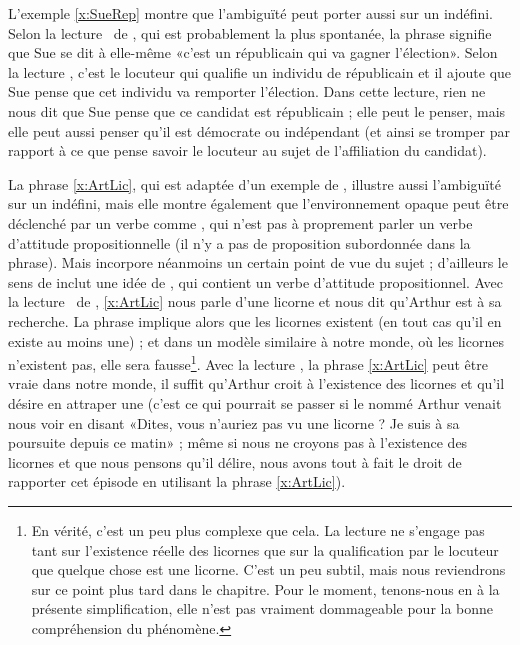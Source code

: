 L'exemple \ref{x:SueRep} montre que l'ambiguïté peut porter aussi sur un {\GN} indéfini.  Selon la lecture \dedicto\ de , qui est probablement la plus spontanée, la phrase signifie que Sue se dit à elle-même «c'est un républicain qui va gagner l'élection».  Selon la lecture \dere, c'est le locuteur qui qualifie un individu de républicain et il ajoute que Sue pense que cet individu va remporter l'élection. Dans cette lecture, rien ne nous dit que Sue pense que ce candidat est républicain ; elle peut le penser, mais elle peut aussi penser qu'il est démocrate ou indépendant (et ainsi se tromper par rapport à ce que pense savoir le locuteur au sujet de l'affiliation du candidat).

\largerpage

La phrase \ref{x:ArtLic}, qui est adaptée d'un exemple de \citet{PTQ}, illustre  aussi l'ambiguïté sur un {\GN} indéfini, mais elle montre également que l'environnement opaque peut être déclenché par un verbe comme , qui n'est pas à proprement parler un verbe d'attitude propositionnelle (il n'y a pas de proposition subordonnée dans la phrase). Mais  incorpore néanmoins un certain point de vue du sujet ; d'ailleurs le sens de  inclut une idée de , qui contient un verbe d'attitude propositionnel.
Avec la lecture \dere\ de , \ref{x:ArtLic} nous parle d'une licorne et nous dit qu'Arthur est à sa recherche. La phrase implique alors que les licornes existent (en tout cas qu'il en existe au moins une) ; et dans un modèle similaire à notre monde, où les licornes n'existent pas, elle sera fausse\footnote{En vérité, c'est un peu plus complexe que cela. La lecture  ne s'engage pas tant sur l'existence réelle des licornes que sur la qualification par le locuteur que quelque chose est une licorne. C'est un peu subtil, mais nous reviendrons sur ce point plus tard dans le chapitre. Pour le moment, tenons-nous en à la présente simplification, elle n'est pas vraiment dommageable pour la bonne compréhension du phénomène.}.  
Avec la lecture \dedicto, la phrase \ref{x:ArtLic} peut être vraie dans notre monde, il suffit qu'Arthur croit à l'existence des licornes et qu'il désire en attraper une (c'est ce qui pourrait se passer si le nommé Arthur venait nous voir en disant «Dites, vous n'auriez pas vu une licorne ? Je suis à sa poursuite depuis ce matin» ; même si nous ne croyons pas à l'existence des licornes et que nous pensons qu'il délire, nous avons tout à fait le droit de rapporter cet épisode en utilisant la phrase \ref{x:ArtLic}).

